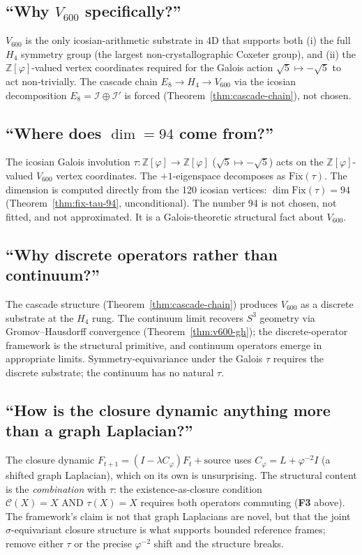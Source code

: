 \documentclass[11pt]{article}
\theoremstyle{plain}
\theoremstyle{definition}
\theoremstyle{remark}
\newcommand{\Zphi}{\mathbb{Z}[\varphi]}
\newcommand{\Ical}{\mathcal{I}}
\newcommand{\Ccal}{\mathcal{C}}
\newcommand{\Fix}{\mathrm{Fix}}
\newcommand{\Cph}{C_\varphi}
\begin{document}
\subsection{``Why $V_{600}$ specifically?''}

$V_{600}$ is the only icosian-arithmetic substrate in 4D that supports both (i) the full $H_4$ symmetry group (the largest non-crystallographic Coxeter group), and (ii) the $\Zphi$-valued vertex coordinates required for the Galois action $\sqrt 5 \mapsto -\sqrt 5$ to act non-trivially. The cascade chain $E_8 \to H_4 \to V_{600}$ via the icosian decomposition $E_8 = \Ical \oplus \Ical'$ is forced (Theorem~\ref{thm:cascade-chain}), not chosen.

\subsection{``Where does $\dim = 94$ come from?''}

The icosian Galois involution $\tau : \Zphi \to \Zphi$ ($\sqrt 5 \mapsto -\sqrt 5$) acts on the $\Zphi$-valued $V_{600}$ vertex coordinates. The $+1$-eigenspace decomposes as $\Fix(\tau)$. The dimension is computed directly from the 120 icosian vertices: $\dim \Fix(\tau) = 94$ (Theorem~\ref{thm:fix-tau-94}, unconditional). The number 94 is not chosen, not fitted, and not approximated. It is a Galois-theoretic structural fact about $V_{600}$.

\subsection{``Why discrete operators rather than continuum?''}

The cascade structure (Theorem~\ref{thm:cascade-chain}) produces $V_{600}$ as a discrete substrate at the $H_4$ rung. The continuum limit recovers $S^3$ geometry via Gromov--Hausdorff convergence (Theorem~\ref{thm:v600-gh}); the discrete-operator framework is the structural primitive, and continuum operators emerge in appropriate limits. Sym\-metry-equivariance under the Galois $\tau$ requires the discrete substrate; the continuum has no natural $\tau$.

\subsection{``How is the closure dynamic anything more than a graph Laplacian?''}

The closure dynamic $F_{t+1} = (I - \lambda \Cph) F_t + \text{source}$ uses $\Cph = L + \varphi^{-2} I$ (a shifted graph Laplacian), which on its own is unsurprising. The structural content is the \emph{combination} with $\tau$: the existence-as-closure condition $\Ccal(X) = X \text{ AND } \tau(X) = X$ requires both operators commuting (\textbf{F3} above). The framework's claim is not that graph Laplacians are novel, but that the joint $\sigma$-equivariant closure structure is what supports bounded reference frames; remove either $\tau$ or the precise $\varphi^{-2}$ shift and the structure breaks.
\end{document}
